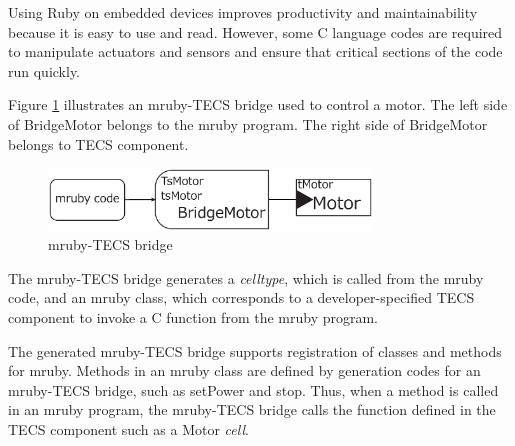 \documentclass[conference]{IEEEtran/IEEEtran/IEEEtran}
\begin{document}
Using Ruby on embedded devices improves productivity and maintainability because it is easy to use and read.
However, some C language codes are required to manipulate actuators and sensors and ensure that critical sections of the code run quickly.

Figure \ref{fig:mruby_TECS_bridge} illustrates an mruby-TECS bridge used to control a motor.
The left side of BridgeMotor belongs to the mruby program.
The right side of BridgeMotor belongs to TECS component.
\begin{figure}[t]
    \centering
    \includegraphics[width=8.6cm,clip]{figure/mruby_TECS_bridge.eps}
    \vspace{-2mm}
\caption{mruby-TECS bridge}
    \vspace{-2mm}
\label{fig:mruby_TECS_bridge}
\end{figure}

The mruby-TECS bridge generates a {\it celltype}, which is called from the mruby code, and an mruby class, which corresponds to a developer-specified TECS component to invoke a C function from the mruby program.

The generated mruby-TECS bridge supports registration of classes and methods for mruby.
Methods in an mruby class are defined by generation codes for an mruby-TECS bridge, such as setPower and stop.
Thus, when a method is called in an mruby program, the mruby-TECS bridge calls the function defined in the TECS component such as a Motor {\it cell}.
\end{document}
